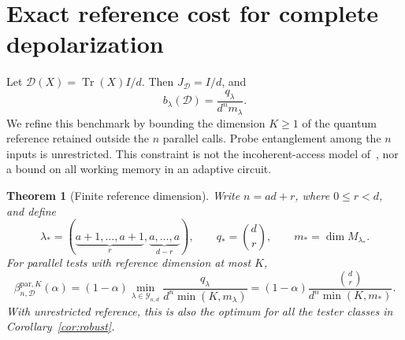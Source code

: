 \documentclass[11pt,a4paper]{article}
\newtheorem{theorem}{Theorem}[section]
\theoremstyle{remark}\newtheorem{remark}[theorem]{Remark}
\DeclareMathOperator{\Tr}{Tr}
\newcommand{\cY}{\mathcal Y_{n,d}}
\begin{document}
\section{Exact reference cost for complete depolarization}
Let $\mathcal D(X)=\Tr(X)I/d$. Then $J_{\mathcal D}=I/d$, and
\begin{equation}\label{eq:depolsector}
 b_\lambda(\mathcal D)=\frac{q_\lambda}{d^n m_\lambda}.
\end{equation}
We refine this benchmark by bounding the dimension $K\geq1$ of the quantum reference retained outside the $n$ parallel calls. Probe entanglement among the $n$ inputs is unrestricted. This constraint is not the incoherent-access model of~\cite{chen_unitarity}, nor a bound on all working memory in an adaptive circuit.

\begin{theorem}[Finite reference dimension]\label{thm:memory}
Write $n=ad+r$, where $0\leq r<d$, and define
\begin{equation}
 \lambda_*=(\underbrace{a+1,\ldots,a+1}_{r},
 \underbrace{a,\ldots,a}_{d-r}),\qquad
 q_*=\binom dr,\qquad m_*=\dim M_{\lambda_*}.
\end{equation}
For parallel tests with reference dimension at most $K$,
\begin{equation}\boxed{\displaystyle
 \beta^{\mathrm{par},K}_{n,\mathcal D}(\alpha)
 =(1-\alpha)\min_{\lambda\in\cY}
 \frac{q_\lambda}{d^n\min(K,m_\lambda)}
 =(1-\alpha)\frac{\binom dr}{d^n\min(K,m_*)}.}\label{eq:finiteK}
\end{equation}
With unrestricted reference, this is also the optimum for all the tester classes in Corollary~\ref{cor:robust}.
\end{theorem}
\end{document}
